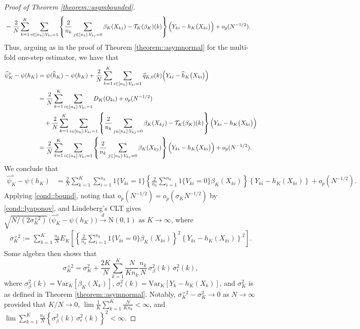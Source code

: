\documentclass[11pt]{article}
\theoremstyle{plain}
\theoremstyle{definition}
\theoremstyle{remark}
\theoremstyle{definition}
\begin{document}
\begin{proof}[Proof of Theorem  \ref{theorem::asymbounded}]
\begin{align*}
    &= \frac{2}{N}   \sum_{k=1}^K \sum_{i \in [n_k]: V_{ki} = 1}  \left\{  \frac{2}{n_k}  \sum_{j \in [n_k]:  V_{kj} = 0} \beta_K(X_{kj})  - \mathcal{T}_{K}(\beta_K)(k)\right\} \Bigl(Y_{ki} -h_K\bigl(X_{ki}\bigr)\Bigr) + o_p(N^{-1/2}).
\end{align*}
Thus, arguing as in the proof of Theorem \ref{theorem::asymnormal} for the multi-fold one-step estimator, we have that
 \begin{align*}
   \widehat{\psi}_K^{\diamond} - \psi(h_K)    &=  \psi(\widehat{h}_K) - \psi(h_K)  +  \frac{2}{N}  \sum_{k=1}^K \sum_{i \in [n_k]: V_{ki} = 1}    \widehat{q}_{K,0}(k) \Bigl(Y_{ki} - \widehat{h}_K\bigl(X_{ki}\bigr)\Bigr) \\
   &=    \frac{2}{N}   \sum_{k=1}^K \sum_{i \in [n_k]: V_{ki} = 1} D_K(O_{ki})  + o_p(N^{-1/2}) \\
         & \quad + \frac{2}{N}   \sum_{k=1}^K \sum_{i \in [n_k]: V_{ki} = 1}  \left\{  \frac{2}{n_k}  \sum_{j \in [n_k]:  V_{kj} = 0} \beta_K(X_{kj})  - \mathcal{T}_{K}(\beta_K)(k)\right\} \Bigl(Y_{ki} -h_K\bigl(X_{ki}\bigr)\Bigr)  \\
          &   = \frac{2}{N}   \sum_{k=1}^K \sum_{i \in [n_k]: V_{ki} = 1}  \left\{  \frac{2}{n_k}  \sum_{j \in [n_k]:  V_{kj} = 0} \beta_K(X_{kj}) \right\} \Bigl(Y_{ki} -h_K\bigl(X_{ki}\bigr)\Bigr) + o_p(N^{-1/2}) .
\end{align*}
We conclude that
\begin{align*}
    \widehat{\psi}_K^{\diamond} - \psi(h_K)  &= \frac{2}{N}   \sum_{k=1}^K \sum_{i=1}^{n_k} 1\{V_{ki} = 1\} \left\{\frac{2}{n_k} \sum_{i=1}^{n_k} 1\{V_{ki} = 0\} \beta_K(X_{ki}) \right\}  \left\{Y_{ki} - h_K(X_{ki}) \right\}  + o_p(N^{-1/2}).
\end{align*}
Applying  \ref{cond::bound}, noting that $o_p(N^{-1/2}) = o_p(\sigma_K N^{-1/2})$ by \ref{cond::lyaponov}, and Lindeberg's CLT gives 
\(\sqrt{N/(2\sigma_K^{\diamond 2})}\, \big( \widehat{\psi}_K^{\diamond} - \psi(h_K) \big) \overset{d}{\to} \text{N}(0,1) \text{ as } K \to \infty\),
where  
\begin{align*}
    \sigma_K^{\diamond 2} := \sum_{k=1}^K \frac{n_k}{N} E_K \left[ \left\{\frac{2}{n_k} \sum_{i=1}^{n_k} 1\{V_{ki} = 0\} \beta_K(X_{ki}) \right\}^2\left\{Y_{ki} - h_K(X_{ki}) \right\}^2 \right].
\end{align*} 
Some algebra then shows that
\[
\sigma_K^{\diamond 2} = \sigma_K^2  +    \frac{2K}{N} \sum_{k=1}^K \frac{N}{Kn_k} \frac{n_k}{N} \,\sigma_{\beta}^{2}(k) \,\sigma_{\epsilon}^{2}(k),
\]
where \(\sigma_{\beta}^{2}(k) = \mathrm{Var}_{K}[\beta_{K}(X_k)]\), \(\sigma_{\epsilon}^{2}(k) = \mathrm{Var}_{K}[Y_k - h_K(X_k)]\), and \( \sigma_K^2 \) is as defined in Theorem \ref{theorem::asymnormal}. Notably, \( \sigma_K^{\diamond 2} - \sigma_K^2 \to 0 \) as \( N \to \infty \) provided that \( K/N \to 0 \), \( \lim \frac{1}{K} \sum_{k=1}^K \frac{N}{K n_k} < \infty \), and $\lim \sum_{k=1}^K \frac{n_k}{N} \left\{ \sigma_{\beta}^{2}(k) \, \sigma_{\epsilon}^{2}(k) \right\}^2 < \infty.$

 


\end{proof}
\end{document}
